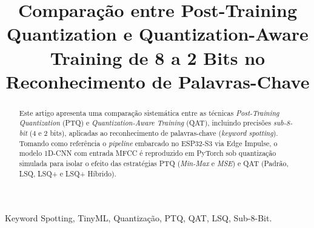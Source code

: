 \documentclass[conference]{IEEEtran}
\begin{document}
\title{Comparação entre Post-Training Quantization e Quantization-Aware Training de 8 a 2 Bits no Reconhecimento de Palavras-Chave}

\author{
}

\maketitle

\begin{abstract}
Este artigo apresenta uma comparação sistemática entre as técnicas \textit{Post-Training Quantization} (PTQ) e \textit{Quantization-Aware Training} (QAT), incluindo precisões \textit{sub-8-bit} (4 e 2 bits), aplicadas ao reconhecimento de palavras-chave (\textit{keyword spotting}). Tomando como referência o \textit{pipeline} embarcado no ESP32-S3 via Edge Impulse, o modelo 1D-CNN com entrada MFCC é reproduzido em PyTorch sob quantização simulada para isolar o efeito das estratégias PTQ (\textit{Min-Max} e \textit{MSE}) e QAT (Padrão, LSQ, LSQ+ e LSQ+ Híbrido).
\end{abstract}

\begin{IEEEkeywords}
Keyword Spotting, TinyML, Quantização, PTQ, QAT, LSQ, Sub-8-Bit.
\end{IEEEkeywords}









\end{document}
